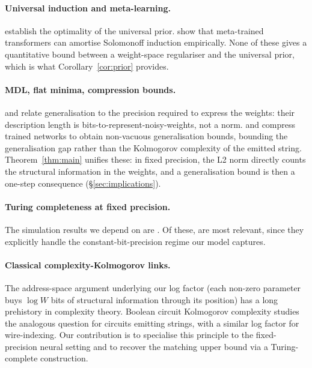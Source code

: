 \documentclass{article}
\theoremstyle{definition}
\begin{document}
\paragraph{Universal induction and meta-learning.}
\citet{solomonoff1964formal,hutter2005universal,legg2007universal} establish the optimality of the universal prior. \citet{grau2024learning} show that meta-trained transformers can amortise Solomonoff induction empirically. None of these gives a quantitative bound between a weight-space regulariser and the universal prior, which is what Corollary~\ref{cor:prior} provides.

\paragraph{MDL, flat minima, compression bounds.}
\citet{hinton1993keeping} and \citet{hochreiter1997flat} relate generalisation to the precision required to express the weights: their description length is bits-to-represent-noisy-weights, not a norm. \citet{arora2018stronger} and \citet{lotter2022pacbayes} compress trained networks to obtain non-vacuous generalisation bounds, bounding the generalisation gap rather than the Kolmogorov complexity of the emitted string. Theorem~\ref{thm:main} unifies these: in fixed precision, the L2 norm directly counts the structural information in the weights, and a generalisation bound is then a one-step consequence (\S\ref{sec:implications}).

\paragraph{Turing completeness at fixed precision.}
The simulation results we depend on are
\citet{perez2019turing,perez2021attention,bhattamishra2020computational,Roberts2024decoder,qiu2025prompt,li2025constant,li2026efficient,giannou2023looped,dehghani2018universal}.
Of these, \citet{li2025constant,li2026efficient} are most relevant, since they
explicitly handle the constant-bit-precision regime our model captures.

\paragraph{Classical complexity-Kolmogorov links.}
The address-space argument underlying our log factor (each non-zero parameter
buys $\log W$ bits of structural information through its position) has a long
prehistory in complexity theory. Boolean circuit Kolmogorov complexity
\citep{allender2001nlnp} studies the analogous question for circuits emitting
strings, with a similar log factor for wire-indexing. Our contribution is to
specialise this principle to the fixed-precision neural setting and to recover
the matching upper bound via a Turing-complete construction.
\end{document}
